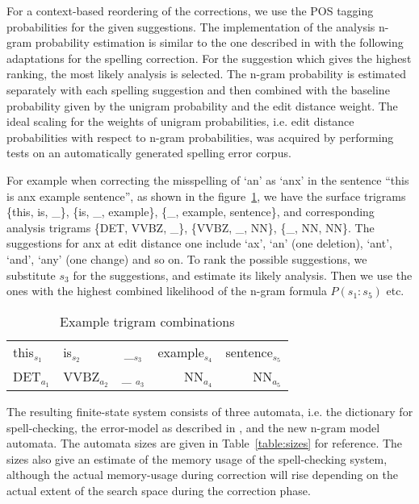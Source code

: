 \documentclass{llncs}
\begin{document}
For a context-based reordering of the corrections, we use the POS tagging
probabilities for the given suggestions. The implementation of the analysis n-gram
probability estimation is similar to the one described in \cite{silfverberg/2011} with
the following adaptations for the spelling correction. For the suggestion which gives
the highest ranking, the most likely analysis is selected.  The n-gram probability
is estimated separately with each spelling suggestion and then combined with
the baseline probability given by the unigram probability and the edit distance
weight. The ideal scaling for the weights of unigram probabilities, i.e.
edit distance probabilities with respect to n-gram probabilities, was acquired
by performing tests on an automatically generated spelling error corpus.

For example when correcting the misspelling of `an' as `anx' in the sentence ``this
is anx example sentence'', as shown in the figure~\ref{fig:example}, we have
the surface trigrams \{this, is, \_\}, \{is, \_, example\}, \{\_, example,
sentence\}, and corresponding analysis trigrams \{DET, VVBZ, \_\}, \{VVBZ, \_,
NN\}, \{\_, NN, NN\}. The suggestions for anx at edit distance one include
`ax', `an' (one deletion), `ant', `and', `any' (one change) and so on. To rank the
possible suggestions, we substitute $s_3$ for the suggestions, and estimate its
likely analysis. Then we use the ones with the highest combined likelihood of the n-gram
formula $P(s_1:s_5)$ etc.

\begin{table}
\caption{Example trigram combinations\label{fig:example}}
\begin{center}
\begin{tabular}{llcrr}
\hline
this$_{s_1}$ & is$_{s_2}$ & \_$_{s_3}$ & example$_{s_4}$ & sentence$_{s_5}$\\
DET$_{a_1}$ & VVBZ$_{a_2}$ & \_ $_{a_3}$& NN$_{a_4}$ & NN$_{a_5}$\\
\hline
\end{tabular}
\end{center}
\end{table}

The resulting finite-state system consists of three automata, i.e. the dictionary
for spell-checking, the error-model as described in
\cite{pirinen/2010/lrec}, and the new n-gram model automata. The automata
sizes are given in Table~\ref{table:sizes} for reference. The sizes also
give an estimate of the memory usage of the spell-checking system, although the
actual memory-usage during correction will rise depending on the actual
extent of the search space during the correction phase.
\end{document}
